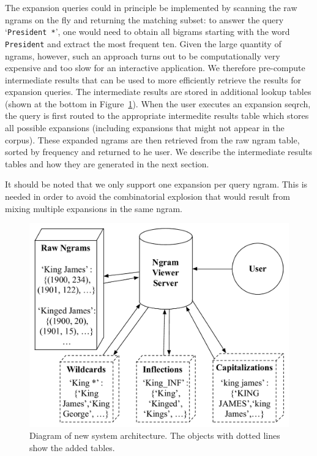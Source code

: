 \documentclass[11pt]{article}
\newcommand{\query}[1]{\texttt{#1}}
\begin{document}
The expansion queries could in principle be implemented by scanning the raw ngrams on the fly and returning the matching subset: to answer the query `\query{President *}', one would need to obtain all bigrams starting with the word \query{President} and extract the most frequent ten. Given the large quantity of ngrams, however, such an approach turns out to be computationally very expensive and too slow for an interactive application. We therefore pre-compute intermediate results that can be used to more efficiently retrieve the results for expansion queries. The intermediate results are stored in additional lookup tables (shown at the bottom in Figure~\ref{fig:architecture}). When the user executes an expansion seqrch, the query is first routed to the appropriate intermedite results table which stores all possible expansions (including expansions that might not appear in the corpus).  These expanded ngrams are then retrieved from the raw ngram table, sorted by frequency and returned to he user.
We describe the intermediate results tables and how they are generated in the next section.

It should be noted that we only support one expansion per query ngram. This is needed in order to avoid the combinatorial explosion that would result from mixing multiple expansions in the same ngram.

\begin{figure}
\includegraphics[width=\columnwidth,keepaspectratio=true]{system_architecture}
\caption{\label{fig:architecture}Diagram of new system architecture. The objects with dotted lines show the added tables.}
\end{figure}
\end{document}
